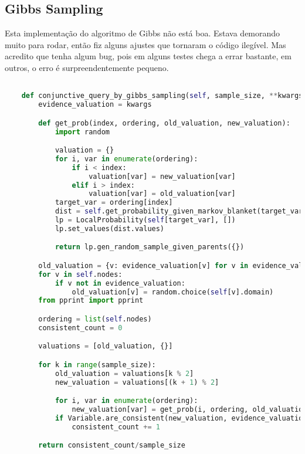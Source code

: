 \documentclass[paper=a4, fontsize=11pt]{scrartcl} %
\numberwithin{equation}{subsection}
\numberwithin{figure}{subsection}
\numberwithin{table}{subsection}
\numberwithin{definition}{subsection}
\numberwithin{theorem}{subsection}
\numberwithin{property}{subsection}
\numberwithin{proposition}{subsection}
\numberwithin{equation}{section}
\numberwithin{figure}{section}
\numberwithin{table}{section}
\numberwithin{definition}{section}
\numberwithin{theorem}{section}
\numberwithin{property}{section}
\numberwithin{proposition}{section}
\begin{document}
\subsection{Gibbs Sampling}

Esta implementação do algoritmo de Gibbs não está boa. Estava demorando muito para rodar, então fiz alguns ajustes 
que tornaram o código ilegível. Mas acredito que tenha algum bug, pois em alguns testes chega a errar bastante, em
outros, o erro é surpreendentemente pequeno.

\begin{lstlisting}[language=python]

    def conjunctive_query_by_gibbs_sampling(self, sample_size, **kwargs):
        evidence_valuation = kwargs

        def get_prob(index, ordering, old_valuation, new_valuation):
            import random

            valuation = {}
            for i, var in enumerate(ordering):
                if i < index:
                    valuation[var] = new_valuation[var]
                elif i > index:
                    valuation[var] = old_valuation[var]
            target_var = ordering[index]
            dist = self.get_probability_given_markov_blanket(target_var, valuation)
            lp = LocalProbability(self[target_var], [])
            lp.set_values(dist.values)

            return lp.gen_random_sample_given_parents({})

        old_valuation = {v: evidence_valuation[v] for v in evidence_valuation}
        for v in self.nodes:
            if v not in evidence_valuation:
                old_valuation[v] = random.choice(self[v].domain)
        from pprint import pprint

        ordering = list(self.nodes)
        consistent_count = 0

        valuations = [old_valuation, {}]

        for k in range(sample_size):
            old_valuation = valuations[k % 2]
            new_valuation = valuations[(k + 1) % 2]

            for i, var in enumerate(ordering):
                new_valuation[var] = get_prob(i, ordering, old_valuation, new_valuation)
            if Variable.are_consistent(new_valuation, evidence_valuation):
                consistent_count += 1

        return consistent_count/sample_size

\end{lstlisting}
\end{document}
